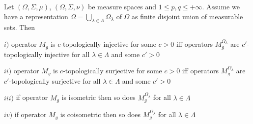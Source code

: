\begin{proposition}\label{MultOpDecompDecomp} Let $(\Omega,\Sigma,\mu)$, $(\Omega,\Sigma,\nu)$ be measure spaces and $1\leq p,q\leq +\infty$. Assume we have a representation $\Omega=\bigcup_{\lambda\in\Lambda}\Omega_\lambda$ of $\Omega$ as finite disjoint union of measurable sets. Then 

$i)$ operator $M_g$ is $c$-topologically injective for some $c>0$ iff operators $M_g^{\Omega_\lambda}$ are $c'$-topologically injective for all $\lambda\in\Lambda$ and some $c'>0$

$ii)$ operator $M_g$ is $c$-topologically surjective for some $c>0$ iff operators $M_g^{\Omega_\lambda}$ are $c'$-topologically surjective for all $\lambda\in\Lambda$ and some $c'>0$

$iii)$ if operator $M_g$ is isometric then so does $M_g^{\Omega_\lambda}$ for all $\lambda\in\Lambda$

$iv)$ if operator $M_g$ is coisometric then so does $M_g^{\Omega_\lambda}$ for all $\lambda\in\Lambda$

\end{proposition}
